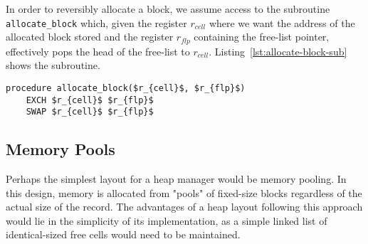 In order to reversibly allocate a block, we assume access to the subroutine \texttt{allocate\_block} which, given the register $r_{cell}$ where we want the address of the allocated block stored and the register $r_{flp}$ containing the free-list pointer, effectively pops the head of the free-list to  $r_{cell}$. Listing~\ref{lst:allocate-block-sub} shows the subroutine.

\begin{lstlisting}[caption={\texttt{allocate\_block} subroutine}, language=janus, style=basic,label={lst:allocate-block-sub}]
procedure allocate_block($r_{cell}$, $r_{flp}$)
	EXCH $r_{cell}$ $r_{flp}$
	SWAP $r_{cell}$ $r_{flp}$
\end{lstlisting}






\subsection{Memory Pools}
Perhaps the simplest layout for a heap manager would be memory pooling. In this design, memory is allocated from "pools" of fixed-size blocks regardless of the actual size of the record. The advantages of a heap layout following this approach would lie in the simplicity of its implementation, as a simple linked list of identical-sized free cells would need to be maintained. 

